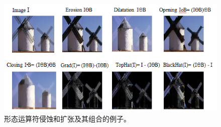 \begin{figure}
	\centering
		\includegraphics[width=\textwidth]{figs/morphology}
	\caption{形态运算符侵蚀和扩张及其组合的例子。
	\label{fig:morphology}}
\end{figure}


